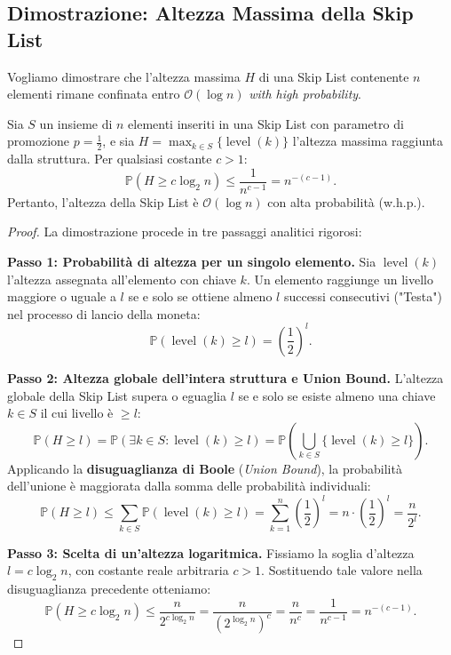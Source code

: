 \FloatBarrier
\subsection{Dimostrazione: Altezza Massima della Skip List}
Vogliamo dimostrare che l'altezza massima $H$ di una Skip List contenente $n$ elementi rimane confinata entro $\mathcal{O}(\log n)$ \textit{with high probability}.

\begin{theorem}
Sia $S$ un insieme di $n$ elementi inseriti in una Skip List con parametro di promozione $p = \frac{1}{2}$, e sia $H = \max_{k \in S} \{\operatorname{level}(k)\}$ l'altezza massima raggiunta dalla struttura. Per qualsiasi costante $c > 1$:
\begin{equation}
  \mathbb{P}(H \ge c \log_2 n) \le \frac{1}{n^{c-1}} = n^{-(c-1)}.
\end{equation}
Pertanto, l'altezza della Skip List è $\mathcal{O}(\log n)$ con alta probabilità (w.h.p.).
\end{theorem}

\begin{proof}
La dimostrazione procede in tre passaggi analitici rigorosi:

\textbf{Passo 1: Probabilità di altezza per un singolo elemento.}
Sia $\operatorname{level}(k)$ l'altezza assegnata all'elemento con chiave $k$. Un elemento raggiunge un livello maggiore o uguale a $l$ se e solo se ottiene almeno $l$ successi consecutivi ("Testa") nel processo di lancio della moneta:
\begin{equation}
  \mathbb{P}(\operatorname{level}(k) \ge l) = \left(\frac{1}{2}\right)^l.
\end{equation}

\textbf{Passo 2: Altezza globale dell'intera struttura e Union Bound.}
L'altezza globale della Skip List supera o eguaglia $l$ se e solo se esiste almeno una chiave $k \in S$ il cui livello è $\ge l$:
\begin{equation}
  \mathbb{P}(H \ge l) = \mathbb{P}\left(\exists k \in S : \operatorname{level}(k) \ge l\right) = \mathbb{P}\left(\bigcup_{k \in S} \{\operatorname{level}(k) \ge l\}\right).
\end{equation}
Applicando la \textbf{disuguaglianza di Boole} (\textit{Union Bound}), la probabilità dell'unione è maggiorata dalla somma delle probabilità individuali:
\begin{equation}
  \mathbb{P}(H \ge l) \le \sum_{k \in S} \mathbb{P}(\operatorname{level}(k) \ge l) = \sum_{k=1}^n \left(\frac{1}{2}\right)^l = n \cdot \left(\frac{1}{2}\right)^l = \frac{n}{2^l}.
\end{equation}

\textbf{Passo 3: Scelta di un'altezza logaritmica.}
Fissiamo la soglia d'altezza $l = c \log_2 n$, con costante reale arbitraria $c > 1$. Sostituendo tale valore nella disuguaglianza precedente otteniamo:
\begin{equation}
  \mathbb{P}(H \ge c \log_2 n) \le \frac{n}{2^{c \log_2 n}} = \frac{n}{\left(2^{\log_2 n}\right)^c} = \frac{n}{n^c} = \frac{1}{n^{c-1}} = n^{-(c-1)}.
\end{equation}
\end{proof}

